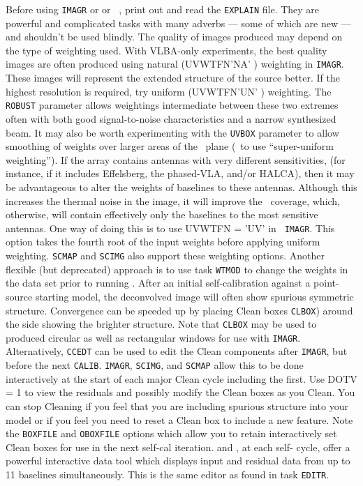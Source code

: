 \xben
\Item Before using {\tt IMAGR} or {\tt {}} or {\tt
    }, print out and read the {\tt EXPLAIN} file.  They
    are powerful and complicated tasks with many adverbs --- some of
    which are new --- and shouldn't be used blindly.
\Item The quality of images produced may depend on the type of
    weighting used.  With VLBA-only experiments, the best quality
    images are often produced using natural ({\us UVWTFN\qs 'NA' \CR})
    weighting in {\tt IMAGR}\@.  These images will represent the
    extended structure of the source better.  If the highest
    resolution is required, try uniform ({\us UVWTFN\qs 'UN' \CR})
    weighting.  The {\tt ROBUST} parameter allows weightings
    intermediate between these two extremes often with both good
    signal-to-noise characteristics and a narrow synthesized beam.  It
    may also be worth experimenting with the {\tt UVBOX} parameter to
    allow smoothing of weights over larger areas of the \uv\ plane
    (\ie\ to use ``super-uniform weighting'').  If the array contains
    antennas with very different sensitivities, (for instance, if it
    includes Effelsberg, the phased-VLA, and/or HALCA), then it may be
    advantageous to alter the weights of baselines to these antennas.
    Although this increases the thermal noise in the image, it will
    improve the \uv\ coverage, which, otherwise, will contain
    effectively only the baselines to the most sensitive antennas.
    One way of doing this is to use {\us UVWTFN = 'UV' \CR} in {\tt
    IMAGR}\@.  This option takes the fourth root of the input weights
    before applying uniform weighting.  {\tt SCMAP} and {\tt SCIMG}
    also support these weighting options.  Another flexible (but
    deprecated) approach is to use task {\tt WTMOD} to change the
    weights in the data set prior to running {\tt {}}\@.
\Item After an initial self-calibration against a point-source
    starting model, the deconvolved image will often show spurious
    symmetric structure.  Convergence can be speeded up by placing
    Clean boxes {\tt CLBOX}) around the side showing the brighter
    structure.  Note that {\tt CLBOX} may be used to produced circular
    as well as rectangular windows for use with {\tt IMAGR}\@.
    Alternatively, {\tt CCEDT} can be used to edit the Clean
    components after {\tt IMAGR}, but before the next {\tt CALIB}\@.
    {\tt IMAGR}, {\tt SCIMG}, and {\tt SCMAP} allow this to be done
    interactively at the start of each major Clean cycle including the
    first.
\Item Use {\us DOTV = 1 \CR} to view the residuals and possibly modify
    the Clean boxes as you Clean.  You can stop Cleaning if you feel
    that you are including spurious structure into your model or if
    you feel you need to reset a Clean box to include a new feature.
    Note the {\tt BOXFILE} and {\tt OBOXFILE} options which allow you
    to retain interactively set Clean boxes for use in the next
    self-cal iteration.
 and {\tt {}}, at each
    self- cycle, offer a powerful interactive data
     tool which displays input and
    residual data from up to 11 baselines simultaneously.  This is the
    same editor as found in task {\tt EDITR}\@.
\xeen

